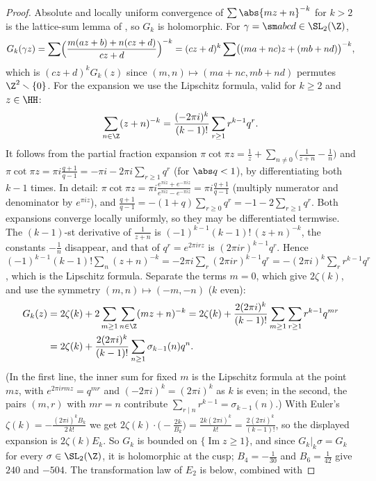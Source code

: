 \begin{proof}
Absolute and locally uniform convergence of $\sum\abs{mz+n}^{-k}$ for $k>2$ is the lattice-sum lemma of , so $G_k$ is holomorphic. For
$\gamma=\sm abcd\in\SL_2(\Z)$,
\[
G_k(\gamma z)=\sum\Bigl(\frac{m(az+b)+n(cz+d)}{cz+d}\Bigr)^{-k}=(cz+d)^k\sum\bigl((ma+nc)z+(mb+nd)\bigr)^{-k},
\]
which is $(cz+d)^kG_k(z)$ since $(m,n)\mapsto(ma+nc,mb+nd)$ permutes $\Z^2\smallsetminus\{0\}$. For the expansion we use the Lipschitz formula, valid for $k\ge2$ and $z\in\HH$:
\[
\sum_{n\in\Z}(z+n)^{-k}=\frac{(-2\pi i)^k}{(k-1)!}\sum_{r\ge1}r^{k-1}q^r .
\]
It follows from the partial fraction expansion $\pi\cot\pi z=\frac1z+\sum_{n\ne0}\bigl(\frac1{z+n}-\frac1n\bigr)$ and $\pi\cot\pi z=\pi i\frac{q+1}{q-1}=-\pi i-2\pi i\sum_{r\ge1}q^r$ (for $\abs q<1$), by
differentiating both $k-1$ times. In detail: $\pi\cot\pi z=\pi i\frac{e^{\pi iz}+e^{-\pi iz}}{e^{\pi iz}-e^{-\pi iz}}=\pi i\frac{q+1}{q-1}$ (multiply numerator and denominator by $e^{\pi iz}$), and
$\frac{q+1}{q-1}=-(1+q)\sum_{r\ge0}q^r=-1-2\sum_{r\ge1}q^r$. Both expansions converge locally uniformly, so they may be differentiated termwise. The $(k-1)$-st derivative of
$\frac1{z+n}$ is $(-1)^{k-1}(k-1)!\,(z+n)^{-k}$, the constants $-\frac1n$ disappear, and that of $q^r=e^{2\pi irz}$ is $(2\pi ir)^{k-1}q^r$. Hence
$(-1)^{k-1}(k-1)!\sum_n(z+n)^{-k}=-2\pi i\sum_r(2\pi ir)^{k-1}q^r=-(2\pi i)^k\sum_rr^{k-1}q^r$, which is the Lipschitz formula. Separate the terms $m=0$, which give $2\zeta(k)$, and use the symmetry $(m,n)\mapsto(-m,-n)$ ($k$ even):
\[
\begin{aligned}
G_k(z)&=2\zeta(k)+2\sum_{m\ge1}\sum_{n\in\Z}(mz+n)^{-k}=2\zeta(k)+\frac{2(2\pi i)^k}{(k-1)!}\sum_{m\ge1}\sum_{r\ge1}r^{k-1}q^{mr}\\
&=2\zeta(k)+\frac{2(2\pi i)^k}{(k-1)!}\sum_{n\ge1}\sigma_{k-1}(n)q^n.
\end{aligned}
\]
(In the first line, the inner sum for fixed $m$ is the Lipschitz formula at the point $mz$, with $e^{2\pi irmz}=q^{mr}$ and $(-2\pi i)^k=(2\pi i)^k$ as $k$ is even; in the second, the
pairs $(m,r)$ with $mr=n$ contribute $\sum_{r\mid n}r^{k-1}=\sigma_{k-1}(n)$.) With Euler's $\zeta(k)=-\frac{(2\pi i)^kB_k}{2\,k!}$ we get
$2\zeta(k)\cdot\bigl(-\frac{2k}{B_k}\bigr)=\frac{2k(2\pi i)^k}{k!}=\frac{2(2\pi i)^k}{(k-1)!}$, so the displayed expansion is $2\zeta(k)E_k$. So $G_k$ is bounded on $\{\operatorname{Im}z\ge1\}$, and since $G_k|_k\sigma=G_k$ for every $\sigma\in\SL_2(\Z)$, it is holomorphic at the cusp;
$B_4=-\frac1{30}$ and $B_6=\frac1{42}$ give $240$ and $-504$. The transformation law of $E_2$ is  below, combined with

\end{proof}
